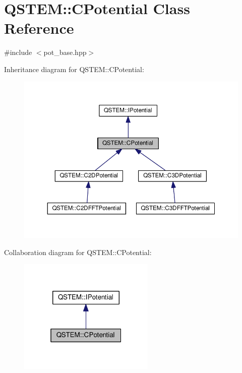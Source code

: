 \hypertarget{class_q_s_t_e_m_1_1_c_potential}{\section{Q\-S\-T\-E\-M\-:\-:C\-Potential Class Reference}
\label{class_q_s_t_e_m_1_1_c_potential}
}


{\ttfamily \#include $<$pot\-\_\-base.\-hpp$>$}



Inheritance diagram for Q\-S\-T\-E\-M\-:\-:C\-Potential\-:
\nopagebreak
\begin{figure}[H]
\begin{center}
\leavevmode
\includegraphics[width=350pt]{class_q_s_t_e_m_1_1_c_potential__inherit__graph}
\end{center}
\end{figure}


Collaboration diagram for Q\-S\-T\-E\-M\-:\-:C\-Potential\-:
\nopagebreak
\begin{figure}[H]
\begin{center}
\leavevmode
\includegraphics[width=184pt]{class_q_s_t_e_m_1_1_c_potential__coll__graph}
\end{center}
\end{figure}
